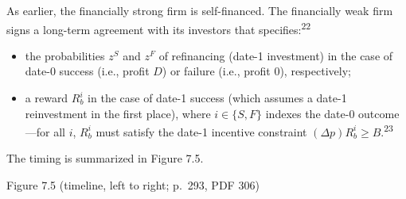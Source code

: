 \documentclass[11pt,a4paper]{article}
\providecommand{\tightlist}{\setlength{\itemsep}{0pt}\setlength{\parskip}{0pt}}
\begin{document}
As earlier, the financially strong firm is self-financed. The financially weak firm signs a
long-term agreement with its investors that specifies:\textsuperscript{22}

\begin{itemize}
\tightlist
\item
  the probabilities \(z^S\) and \(z^F\) of refinancing (date-1 investment) in the case of date-0
  success (i.e., profit \(D\)) or failure (i.e., profit 0), respectively;
\item
  a reward \(R_b^i\) in the case of date-1 success (which assumes a date-1 reinvestment in the first
  place), where \(i \in \{S, F\}\) indexes the date-0 outcome---for all \(i\), \(R_b^i\) must
  satisfy the date-1 incentive constraint \((\Delta p)R_b^i \geqslant B\).\textsuperscript{23}
\end{itemize}

The timing is summarized in Figure 7.5.

Figure 7.5 (timeline, left to right; p.~293, PDF 306)
\end{document}
